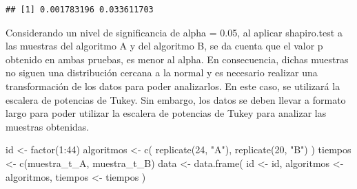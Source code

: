 \documentclass[
]{article}
\newenvironment{Shaded}{\begin{snugshade}}{\end{snugshade}}
\newcommand{\DecValTok}[1]{\textcolor[rgb]{0.00,0.00,0.81}{#1}}
\newcommand{\FunctionTok}[1]{\textcolor[rgb]{0.00,0.00,0.00}{#1}}
\newcommand{\NormalTok}[1]{#1}
\newcommand{\OtherTok}[1]{\textcolor[rgb]{0.56,0.35,0.01}{#1}}
\newcommand{\SpecialCharTok}[1]{\textcolor[rgb]{0.00,0.00,0.00}{#1}}
\newcommand{\StringTok}[1]{\textcolor[rgb]{0.31,0.60,0.02}{#1}}
\begin{document}
\begin{Shaded}
\end{Shaded}

\begin{verbatim}
## [1] 0.001783196 0.033611703
\end{verbatim}

Considerando un nivel de significancia de alpha = 0.05, al aplicar
shapiro.test a las muestras del algoritmo A y del algoritmo B, se da
cuenta que el valor p obtenido en ambas pruebas, es menor al alpha. En
consecuencia, dichas muestras no siguen una distribución cercana a la
normal y es necesario realizar una transformación de los datos para
poder analizarlos. En este caso, se utilizará la escalera de potencias
de Tukey. Sin embargo, los datos se deben llevar a formato largo para
poder utilizar la escalera de potencias de Tukey para analizar las
muestras obtenidas.

\begin{Shaded}
\begin{Highlighting}[]
\NormalTok{id }\OtherTok{\textless{}{-}} \FunctionTok{factor}\NormalTok{(}\DecValTok{1}\SpecialCharTok{:}\DecValTok{44}\NormalTok{)}
\NormalTok{algoritmos }\OtherTok{\textless{}{-}} \FunctionTok{c}\NormalTok{(}
                \FunctionTok{replicate}\NormalTok{(}\DecValTok{24}\NormalTok{, }\StringTok{"A"}\NormalTok{),}
                \FunctionTok{replicate}\NormalTok{(}\DecValTok{20}\NormalTok{, }\StringTok{"B"}\NormalTok{)}
\NormalTok{                )}
\NormalTok{tiempos }\OtherTok{\textless{}{-}} \FunctionTok{c}\NormalTok{(muestra\_t\_A, muestra\_t\_B)}
\NormalTok{data }\OtherTok{\textless{}{-}} \FunctionTok{data.frame}\NormalTok{(}
\NormalTok{                    id }\OtherTok{\textless{}{-}}\NormalTok{ id,}
\NormalTok{                    algoritmos }\OtherTok{\textless{}{-}}\NormalTok{ algoritmos,}
\NormalTok{                    tiempos }\OtherTok{\textless{}{-}}\NormalTok{ tiempos}
\NormalTok{                    )}
\end{Highlighting}
\end{Shaded}
\end{document}
